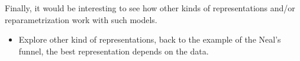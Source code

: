 Finally, it would be interesting to see how other kinds of representations and/or reparametrization work with such models.



\begin{itemize}
    \item Explore other kind of representations, back to the example of the Neal's funnel, the best representation depends on the data.
\end{itemize}


